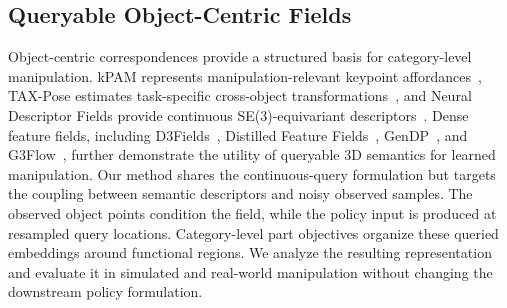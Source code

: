 \subsection{Queryable Object-Centric Fields}
Object-centric correspondences provide a structured basis for category-level manipulation. kPAM represents manipulation-relevant keypoint affordances~\cite{manuelli2019kpam}, TAX-Pose estimates task-specific cross-object transformations~\cite{pan2023tax}, and Neural Descriptor Fields provide continuous SE(3)-equivariant descriptors~\cite{simeonov2022neural}. Dense feature fields, including D3Fields~\cite{wang2023d}, Distilled Feature Fields~\cite{shen2023distilled}, GenDP~\cite{wang2024gendp}, and G3Flow~\cite{chen2025g3flow}, further demonstrate the utility of queryable 3D semantics for learned manipulation. Our method shares the continuous-query formulation but targets the coupling between semantic descriptors and noisy observed samples. The observed object points condition the field, while the policy input is produced at resampled query locations. Category-level part objectives organize these queried embeddings around functional regions. We analyze the resulting representation and evaluate it in simulated and real-world manipulation without changing the downstream policy formulation.
